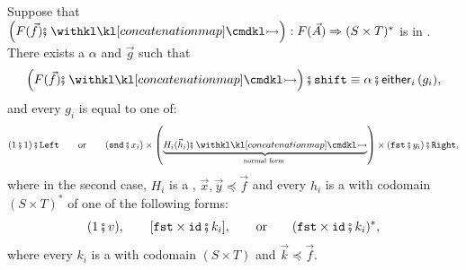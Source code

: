 \begin{lemma}\label{lem:exchange-normal-shift}
    Suppose that $\left( F(\vec f) \comp \concmap \right): F(\vec A) \dropmap (S \times T)^*$ is in . There exists a  $\alpha$ and  $\vec g$ such that 
    \[
        \left( F(\vec f) \comp \concmap \right) \comp \shiftterm \equiv \alpha \comp \eithermany{i}{(g_i)},
    \]
    and every $g_i$ is equal to one of:
    \[
        (1 \comp 1) \comp \leftterm \qquad \text{or} \qquad (\sndterm \comp x_i) \times \left( \myunderbrace{H_i(\vec h_i) \comp \concmap}{\text{normal form}} \right) \times (\fstterm \comp y_i) \comp \rightterm,
    \]
    where in the second case, $H_i$ is a , $\vec x, \vec y \preceq \vec f$ and every $h_i$ is a  with codomain $(S \times T)^*$ of one of the following forms:
    \[
        (1 \comp v), \qquad [\fstterm \times \idterm \comp k_i], \qquad \text{or} \qquad (\fstterm \times \idterm \comp k_i)^*,
    \]
    where every $k_i$ is a  with codomain $(S \times T)$ and $\vec k \preceq \vec f$.
\end{lemma}
